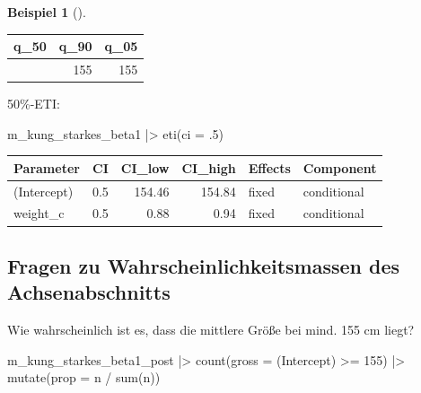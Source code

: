 \documentclass[
  ngerman,
  letterpaper,
  twoside,
  open=any]{scrbook}
\newenvironment{Shaded}{\begin{snugshade}}{\end{snugshade}}
\newcommand{\AttributeTok}[1]{\textcolor[rgb]{0.40,0.45,0.13}{#1}}
\newcommand{\DecValTok}[1]{\textcolor[rgb]{0.68,0.00,0.00}{#1}}
\newcommand{\FunctionTok}[1]{\textcolor[rgb]{0.28,0.35,0.67}{#1}}
\newcommand{\NormalTok}[1]{\textcolor[rgb]{0.00,0.23,0.31}{#1}}
\newcommand{\SpecialCharTok}[1]{\textcolor[rgb]{0.37,0.37,0.37}{#1}}
\newcommand{\StringTok}[1]{\textcolor[rgb]{0.13,0.47,0.30}{#1}}
\newcounter{none} %
\theoremstyle{definition}
\newtheorem{example}{Beispiel}[chapter]
\theoremstyle{plain}
\theoremstyle{definition}
\theoremstyle{definition}
\theoremstyle{remark}
\begin{document}
\begin{example}[]
{\def\LTcaptype{none} %
\begin{longtable}[]{@{}rrr@{}}
\toprule\noalign{}
q\_50 & q\_90 & q\_05 \\
\midrule\noalign{}
\endhead
\bottomrule\noalign{}
\endlastfoot
155 & 155 & 155 \\
\end{longtable}
}

50\%-ETI:

\begin{Shaded}
\begin{Highlighting}[]
\NormalTok{m\_kung\_starkes\_beta1 }\SpecialCharTok{|\textgreater{}} 
  \FunctionTok{eti}\NormalTok{(}\AttributeTok{ci =}\NormalTok{ .}\DecValTok{5}\NormalTok{)}
\end{Highlighting}
\end{Shaded}

{\def\LTcaptype{none} %
\begin{longtable}[]{@{}lrrrll@{}}
\toprule\noalign{}
Parameter & CI & CI\_low & CI\_high & Effects & Component \\
\midrule\noalign{}
\endhead
\bottomrule\noalign{}
\endlastfoot
(Intercept) & 0.5 & 154.46 & 154.84 & fixed & conditional \\
weight\_c & 0.5 & 0.88 & 0.94 & fixed & conditional \\
\end{longtable}
}

\subsection{Fragen zu Wahrscheinlichkeitsmassen des
Achsenabschnitts}\label{fragen-zu-wahrscheinlichkeitsmassen-des-achsenabschnitts}

Wie wahrscheinlich ist es, dass die mittlere Größe bei mind. 155 cm
liegt?

\begin{Shaded}
\begin{Highlighting}[]
\NormalTok{m\_kung\_starkes\_beta1\_post }\SpecialCharTok{|\textgreater{}} 
  \FunctionTok{count}\NormalTok{(}\AttributeTok{gross =} \StringTok{\textasciigrave{}}\AttributeTok{(Intercept)}\StringTok{\textasciigrave{}} \SpecialCharTok{\textgreater{}=} \DecValTok{155}\NormalTok{) }\SpecialCharTok{|\textgreater{}} 
  \FunctionTok{mutate}\NormalTok{(}\AttributeTok{prop =}\NormalTok{ n }\SpecialCharTok{/} \FunctionTok{sum}\NormalTok{(n))}
\end{Highlighting}
\end{Shaded}


\end{example}
\end{document}
